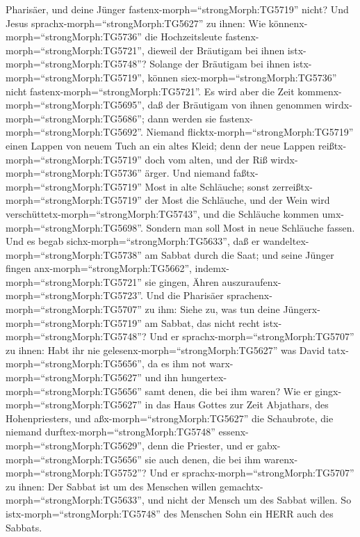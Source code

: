 Pharisäer, und deine Jünger fastenx-morph=``strongMorph:TG5719'' nicht?
 Und Jesus sprachx-morph=``strongMorph:TG5627'' zu ihnen:
Wie könnenx-morph=``strongMorph:TG5736'' die Hochzeitsleute
fastenx-morph=``strongMorph:TG5721'', dieweil der Bräutigam bei ihnen
istx-morph=``strongMorph:TG5748''? Solange der Bräutigam bei ihnen
istx-morph=``strongMorph:TG5719'', können
siex-morph=``strongMorph:TG5736'' nicht
fastenx-morph=``strongMorph:TG5721''.  Es wird aber die
Zeit kommenx-morph=``strongMorph:TG5695'', daß der Bräutigam von ihnen
genommen wirdx-morph=``strongMorph:TG5686''; dann werden sie
fastenx-morph=``strongMorph:TG5692''.  Niemand
flicktx-morph=``strongMorph:TG5719'' einen Lappen von neuem Tuch an ein
altes Kleid; denn der neue Lappen reißtx-morph=``strongMorph:TG5719''
doch vom alten, und der Riß wirdx-morph=``strongMorph:TG5736'' ärger.
 Und niemand faßtx-morph=``strongMorph:TG5719'' Most in
alte Schläuche; sonst zerreißtx-morph=``strongMorph:TG5719'' der Most
die Schläuche, und der Wein wird
verschüttetx-morph=``strongMorph:TG5743'', und die Schläuche kommen
umx-morph=``strongMorph:TG5698''. Sondern man soll Most in neue
Schläuche fassen.  Und es begab
sichx-morph=``strongMorph:TG5633'', daß er
wandeltex-morph=``strongMorph:TG5738'' am Sabbat durch die Saat; und
seine Jünger fingen anx-morph=``strongMorph:TG5662'',
indemx-morph=``strongMorph:TG5721'' sie gingen, Ähren
auszuraufenx-morph=``strongMorph:TG5723''.  Und die
Pharisäer sprachenx-morph=``strongMorph:TG5707'' zu ihm: Siehe zu, was
tun deine Jüngerx-morph=``strongMorph:TG5719'' am Sabbat, das nicht
recht istx-morph=``strongMorph:TG5748''?  Und er
sprachx-morph=``strongMorph:TG5707'' zu ihnen: Habt ihr nie
gelesenx-morph=``strongMorph:TG5627'' was David
tatx-morph=``strongMorph:TG5656'', da es ihm not
warx-morph=``strongMorph:TG5627'' und ihn
hungertex-morph=``strongMorph:TG5656'' samt denen, die bei ihm waren?
 Wie er gingx-morph=``strongMorph:TG5627'' in das Haus
Gottes zur Zeit Abjathars, des Hohenpriesters, und
aßx-morph=``strongMorph:TG5627'' die Schaubrote, die niemand
durftex-morph=``strongMorph:TG5748''
essenx-morph=``strongMorph:TG5629'', denn die Priester, und er
gabx-morph=``strongMorph:TG5656'' sie auch denen, die bei ihm
warenx-morph=``strongMorph:TG5752''?  Und er
sprachx-morph=``strongMorph:TG5707'' zu ihnen: Der Sabbat ist um des
Menschen willen gemachtx-morph=``strongMorph:TG5633'', und nicht der
Mensch um des Sabbat willen.  So
istx-morph=``strongMorph:TG5748'' des Menschen Sohn ein HERR auch des
Sabbats.

